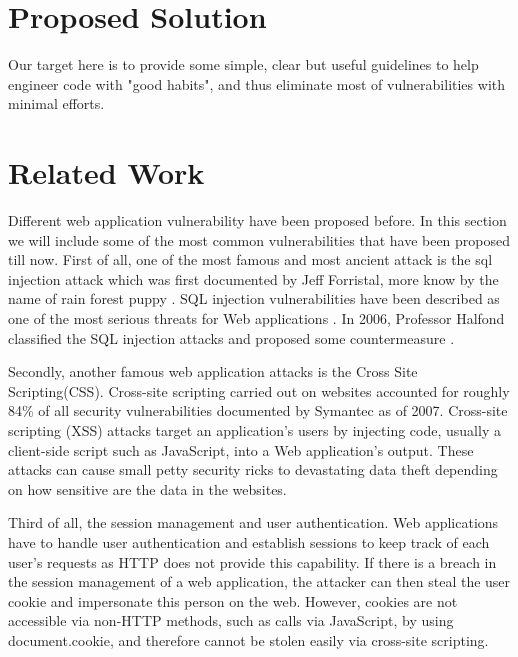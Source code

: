 \documentclass[conference]{IEEEtran}
\begin{document}
\section{Proposed Solution}
Our target here is to provide some simple, clear but useful guidelines
to help engineer code with "good habits", and thus
eliminate most of vulnerabilities with minimal efforts.

%
%
%
\section{Related Work}
Different web application vulnerability have been proposed before. In this section we will include some of the most common 
vulnerabilities that have been proposed till now. First of all, one of the most famous and most ancient attack is the sql injection 
attack which was first documented by Jeff Forristal, more know by the name of rain forest puppy \cite{Jeff}. 
 SQL injection vulnerabilities have been described as one of the most serious threats for Web applications \cite{Aucsmith} \cite{TO}. 
 In 2006, Professor Halfond classified the SQL injection attacks and proposed some countermeasure \cite{halfond06mar}.

Secondly, another famous web application attacks is the Cross Site Scripting(CSS). 
Cross-site scripting carried out on websites accounted for roughly 84\% of all security vulnerabilities documented by Symantec as of 2007\cite{symantec}. 
Cross-site scripting (XSS) attacks target an application's users by injecting code, usually a client-side script such as JavaScript, into a Web application's output. 
These attacks can cause small petty security ricks to devastating data theft depending on how sensitive are the data in the websites.

Third of all, the session management and user authentication. Web applications have to handle user authentication and establish sessions to keep track 
of each user's requests as HTTP does not provide this capability. If there is a breach in the session management of 
a web application, the attacker can then steal the user cookie and impersonate this person on the web. 
However, cookies are not accessible via non-HTTP methods, such as calls via JavaScript, by using document.cookie, and therefore cannot be stolen easily via cross-site scripting\cite{symantec}.
\end{document}
